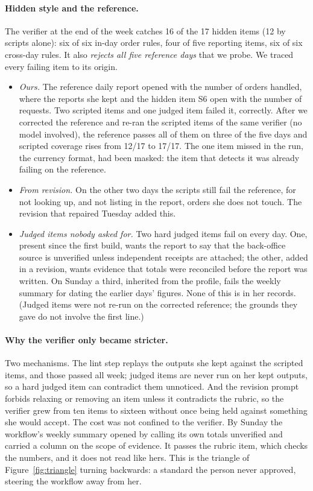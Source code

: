 \documentclass[10pt]{article}
\begin{document}
\paragraph{Hidden style and the reference.} The verifier at the end of the week catches 16 of the 17 hidden items
(12 by scripts alone): six of six in-day order rules, four of five reporting items, six of six cross-day rules.
It also \emph{rejects all five reference days} that we probe. We traced every failing item to its origin.
\begin{itemize}
\item \emph{Ours.} The reference daily report opened with the number of orders handled, where the reports she kept
      and the hidden item S6 open with the number of requests. Two scripted items and one judged item failed it,
      correctly. After we corrected the reference and re-ran the scripted items of the same verifier (no model
      involved), the reference passes all of them on three of the five days and scripted coverage rises from
      12/17 to 17/17. The one item missed in the run, the currency format, had been masked: the item that
      detects it was already failing on the reference.
\item \emph{From revision.} On the other two days the scripts still fail the reference, for not looking up, and
      not listing in the report, orders she does not touch. The revision that repaired Tuesday added this.
\item \emph{Judged items nobody asked for.} Two hard judged items fail on every day. One, present since the
      first build, wants the report to say that the back-office source is unverified unless independent receipts
      are attached; the other, added in a revision, wants evidence that totals were reconciled before the report
      was written. On Sunday a third, inherited from the profile, fails the weekly summary for dating the earlier
      days' figures. None of this is in her records. (Judged items were not re-run on the corrected reference;
      the grounds they gave do not involve the first line.)
\end{itemize}

\paragraph{Why the verifier only became stricter.} Two mechanisms. The lint step replays the outputs she kept
against the scripted items, and those passed all week; judged items are never run on her kept outputs, so a hard
judged item can contradict them unnoticed. And the revision prompt forbids relaxing or removing an item unless it contradicts
the rubric, so the verifier grew from ten items to sixteen without once being held against something she would accept. The cost
was not confined to the verifier. By Sunday the workflow's weekly summary opened by calling its own totals
unverified and carried a column on the scope of evidence. It passes the rubric item, which checks the numbers,
and it does not read like hers. This is the triangle of Figure~\ref{fig:triangle} turning backwards: a standard
the person never approved, steering the workflow away from her.
\end{document}
